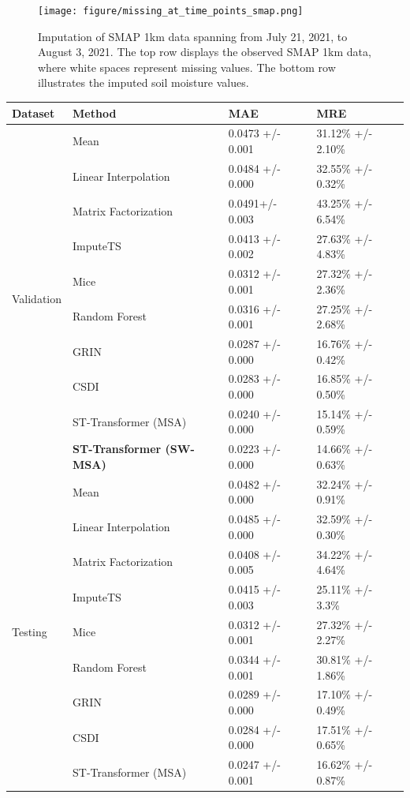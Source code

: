 \documentclass[11pt]{article}
\begin{document}
\begin{figure}[H]
\centering
\texttt{[image: figure/missing\_at\_time\_points\_smap.png]}
\caption{Imputation of SMAP 1km data spanning from July 21, 2021, to August 3, 2021. The top row displays the observed SMAP 1km data, where white spaces represent missing values. The bottom row illustrates the imputed soil moisture values.}
\label{fig: missing_at_time_points_smap} 
\end{figure}


\begin{table}[h!]
    \centering
    \begin{tabularx}{\textwidth}{llXX}
        \toprule
        Dataset & Method & MAE & MRE \\
        \midrule
        \multirow{10}{*}{Validation}&
        Mean & 0.0473 +/- 0.001& 31.12\% +/- 2.10\%  \\
        &Linear Interpolation & 0.0484 +/- 0.000 & 32.55\% +/- 0.32\%\\
        &Matrix Factorization & 0.0491+/- 0.003 & 43.25\% +/- 6.54\% \\
        &ImputeTS & 0.0413 +/- 0.002 & 27.63\% +/- 4.83\% \\
        &Mice & 0.0312 +/- 0.001& 27.32\% +/- 2.36\% \\
        &Random Forest &  0.0316 +/- 0.001&  27.25\% +/- 2.68\%\\
        &GRIN & 0.0287 +/- 0.000 & 16.76\% +/- 0.42\%\\
        &CSDI & 0.0283 +/- 0.000 &16.85\% +/- 0.50\%\\
        &ST-Transformer (MSA) & 0.0240 +/- 0.000 & 15.14\% +/- 0.59\%\\
        &\textbf{ST-Transformer (SW-MSA)} & 0.0223 +/- 0.000 & 14.66\% +/- 0.63\%\\
        
        \midrule
        \multirow{10}{*}{Testing}&Mean & 0.0482 +/- 0.000 & 32.24\% +/- 0.91\%  \\
        &Linear Interpolation & 0.0485 +/- 0.000& 32.59\% +/- 0.30\%\\
        &Matrix Factorization & 0.0408 +/- 0.005& 34.22\% +/- 4.64\% \\
        &ImputeTS & 0.0415 +/- 0.003 & 25.11\% +/- 3.3\% \\
        &Mice & 0.0312 +/- 0.001& 27.32\% +/- 2.27\% \\
        &Random Forest &  0.0344 +/- 0.001&  30.81\% +/- 1.86\%\\
        &GRIN & 0.0289 +/- 0.000 & 17.10\% +/- 0.49\%\\
        &CSDI & 0.0284 +/- 0.000 &17.51\% +/- 0.65\%\\
        &ST-Transformer (MSA) & 0.0247 +/- 0.001 & 16.62\% +/- 0.87\%\\


\end{tabularx}
\end{table}
\end{document}
